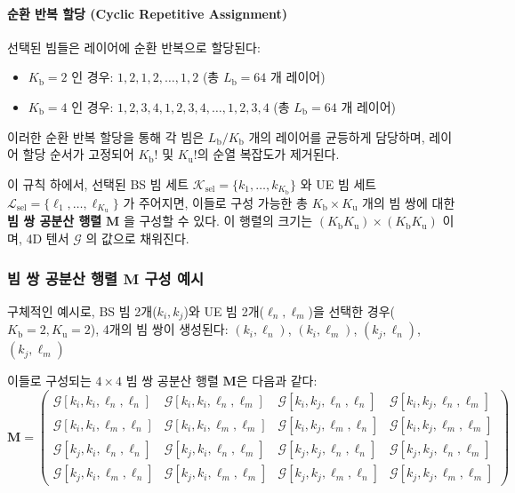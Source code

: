 \documentclass[10pt]{article}
\begin{document}
\paragraph{순환 반복 할당 (Cyclic Repetitive Assignment)}
선택된 빔들은 레이어에 순환 반복으로 할당된다:
\begin{itemize}
    \item $K_{\text{b}}=2$ 인 경우: $1,2,1,2,\ldots,1,2$ (총 $L_{\text{b}}=64$ 개 레이어)
    \item $K_{\text{b}}=4$ 인 경우: $1,2,3,4,1,2,3,4,\ldots,1,2,3,4$ (총 $L_{\text{b}}=64$ 개 레이어)
\end{itemize}
이러한 순환 반복 할당을 통해 각 빔은 $L_{\text{b}}/K_{\text{b}}$ 개의 레이어를 균등하게 담당하며, 레이어 할당 순서가 고정되어 $K_{\text{b}}!$ 및 $K_{\text{u}}!$의 순열 복잡도가 제거된다.

이 규칙 하에서, 선택된 BS 빔 세트 $\mathcal{K}_{\text{sel}} = \{k_1, \dots, k_{K_{\text{b}}}\}$ 와 UE 빔 세트 $\mathcal{L}_{\text{sel}} = \{\ell_1, \dots, \ell_{K_{\text{u}}}\}$ 가 주어지면, 이들로 구성 가능한 총 $K_{\text{b}} \times K_{\text{u}}$ 개의 빔 쌍에 대한 \textbf{빔 쌍 공분산 행렬} $\mathbf{M}$ 을 구성할 수 있다. 이 행렬의 크기는 $(K_{\text{b}} K_{\text{u}}) \times (K_{\text{b}} K_{\text{u}})$ 이며, 4D 텐서 $\mathcal{G}$ 의 값으로 채워진다.

\subsubsection{빔 쌍 공분산 행렬 $\mathbf{M}$ 구성 예시}
구체적인 예시로, BS 빔 2개($k_i, k_j$)와 UE 빔 2개($\ell_n, \ell_m$)을 선택한 경우($K_{\text{b}} = 2, K_{\text{u}} = 2$), 4개의 빔 쌍이 생성된다:
$(k_i, \ell_n)$, $(k_i, \ell_m)$, $(k_j, \ell_n)$, $(k_j, \ell_m)$

이들로 구성되는 $4 \times 4$ 빔 쌍 공분산 행렬 $\mathbf{M}$은 다음과 같다:
\begin{equation}
\mathbf{M} = \begin{pmatrix}
\mathcal{G}[k_i, k_i, \ell_n, \ell_n] & \mathcal{G}[k_i, k_i, \ell_n, \ell_m] & \mathcal{G}[k_i, k_j, \ell_n, \ell_n] & \mathcal{G}[k_i, k_j, \ell_n, \ell_m] \\
\mathcal{G}[k_i, k_i, \ell_m, \ell_n] & \mathcal{G}[k_i, k_i, \ell_m, \ell_m] & \mathcal{G}[k_i, k_j, \ell_m, \ell_n] & \mathcal{G}[k_i, k_j, \ell_m, \ell_m] \\
\mathcal{G}[k_j, k_i, \ell_n, \ell_n] & \mathcal{G}[k_j, k_i, \ell_n, \ell_m] & \mathcal{G}[k_j, k_j, \ell_n, \ell_n] & \mathcal{G}[k_j, k_j, \ell_n, \ell_m] \\
\mathcal{G}[k_j, k_i, \ell_m, \ell_n] & \mathcal{G}[k_j, k_i, \ell_m, \ell_m] & \mathcal{G}[k_j, k_j, \ell_m, \ell_n] & \mathcal{G}[k_j, k_j, \ell_m, \ell_m]
\end{pmatrix}
\end{equation}
\end{document}
